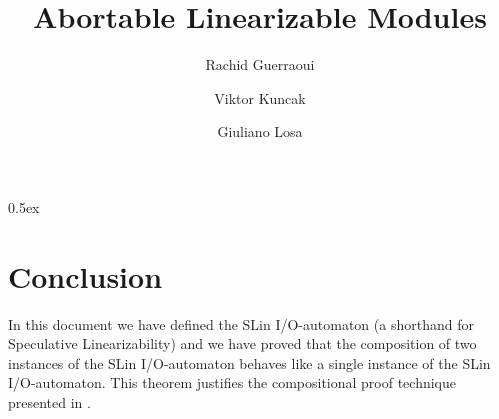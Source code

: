\documentclass[11pt,a4paper]{article}
\begin{document}
\title{Abortable Linearizable Modules}
\author{Rachid Guerraoui \and Viktor Kuncak \and Giuliano Losa}
\maketitle



\tableofcontents


\parindent 0pt\parskip 0.5ex



\section{Conclusion}

In this document we have defined the SLin I/O-automaton (a shorthand for Speculative Linearizability) and we have proved that the composition of two instances of the SLin I/O-automaton behaves like a single instance of the SLin I/O-automaton. This theorem justifies the compositional proof technique presented in \cite{Losa2014}.



\end{document}
